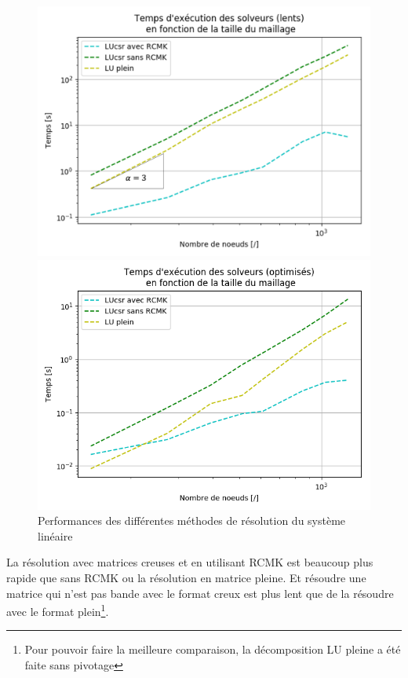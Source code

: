 \documentclass[11pt]{article}
\begin{document}
\begin{figure}
    \begin{minipage}{0.5\linewidth}
    \includegraphics[width = \textwidth]{graph_slow.png}
    \end{minipage}\hfill 
    \begin{minipage}{0.5 \linewidth}
    \includegraphics[width = \textwidth]{graph_opt.png}
    \end{minipage}
    \caption{Performances des différentes méthodes de résolution du système linéaire}
    \label{perf-graph}
\end{figure}

La résolution avec matrices creuses et en utilisant RCMK est beaucoup plus rapide que sans RCMK ou la résolution en matrice pleine. Et résoudre une matrice qui n'est pas bande avec le format creux est plus lent que de la résoudre avec le format plein\footnote{Pour pouvoir faire la meilleure comparaison, la décomposition LU pleine a été faite sans pivotage}.\\
\vspace{-8pt}
\end{document}
